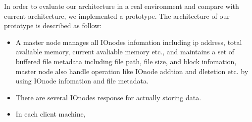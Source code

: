 In order to evaluate our architecture in a real environment and compare with current architecture, we implemented a prototype. 
The architecture of our prototype is described as follow:

\begin{itemize}
	\item A master node manages all IOnodes infomation including ip address, total avaliable memory, current avaliable memory etc., and maintains a set of buffered file metadata including file path, file size, and block infomation, master node also handle operation like IOnode addtion and dletetion etc. by using IOnode infomation and file metadata.
	\item There are several IOnodes response for actually storing data.
	\item In each client machine, 
\end{itemize}
